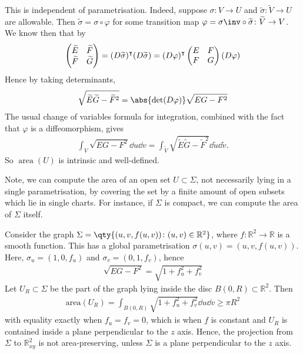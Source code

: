 \begin{remark}
	This is independent of parametrisation.
	Indeed, suppose $\sigma \colon V \to U$ and $\widetilde \sigma \colon \widetilde V \to U$ are allowable.
	Then $\widetilde \sigma = \sigma \circ \varphi$ for some transition map $\varphi = \sigma\inv \circ \widetilde \sigma \colon \widetilde V \to V$.
	We know then that by 
	\begin{align*}
		\begin{pmatrix}
			\widetilde E & \widetilde F \\
			\widetilde F & \widetilde G
		\end{pmatrix} = (D\widetilde \sigma)^\intercal (D\widetilde \sigma) = (D\varphi)^\intercal \begin{pmatrix}
			E & F \\
			F & G
		\end{pmatrix} (D\varphi)
	\end{align*}
	Hence by taking determinants,
	\begin{align*}
		\sqrt{\widetilde E \widetilde G - \widetilde F^2} = \abs{\det(D\varphi)} \sqrt{EG - F^2}
	\end{align*}
	The usual change of variables formula for integration, combined with the fact that $\varphi$ is a diffeomorphism, gives
	\begin{align*}
		\int_V \sqrt{EG - F^2} \dd{u}\dd{v} = \int_{\widetilde V} \sqrt{\widetilde E \widetilde G - \widetilde F^2} \dd{\widetilde u}\dd{\widetilde v}.
	\end{align*}
	So $\operatorname{area}(U)$ is intrinsic and well-defined.

	Note, we can compute the area of an open set $U \subset \Sigma$, not necessarily lying in a single parametrisation, by covering the set by a finite amount of open subsets which lie in single charts.
	For instance, if $\Sigma$ is compact, we can compute the area of $\Sigma$ itself.
\end{remark}

\begin{example}
	Consider the graph $\Sigma = \qty{(u,v,f(u,v)) \colon (u,v) \in \mathbb R^2}$, where $f \colon \mathbb R^2 \to \mathbb R$ is a smooth function.
	This has a global parametrisation $\sigma(u,v) = (u,v,f(u,v))$.
	Here, $\sigma_u = (1,0,f_u)$ and $\sigma_v = (0,1,f_v)$, hence
	\begin{align*}
		\sqrt{EG - F^2} = \sqrt{1+f_u^2+f_v^2}
	\end{align*}
	Let $U_R \subset \Sigma$ be the part of the graph lying inside the disc $B(0,R) \subset \mathbb R^2$.
	Then
	\begin{align*}
		\mathrm{area}(U_R) = \int_{B(0,R)} \sqrt{1+f_u^2+f_v^2} \dd{u}\dd{v} \geq \pi R^2
	\end{align*}
	with equality exactly when $f_u = f_v = 0$, which is when $f$ is constant and $U_R$ is contained inside a plane perpendicular to the $z$ axis.
	Hence, the projection from $\Sigma$ to $\mathbb R^2_{xy}$ is not area-preserving, unless $\Sigma$ is a plane perpendicular to the $z$ axis.
\end{example}

